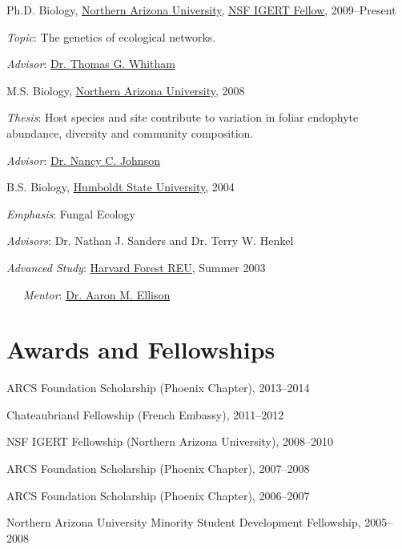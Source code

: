 \documentclass[letterpaper]{article}
\renewenvironment{itemize}{
  \begin{list}{}{
    \setlength{\leftmargin}{1em}
  }
}{
  \end{list}
}
\begin{document}
\begin{itemize}
  \item Ph.D. Biology, \href{http://www.nau.edu}{Northern Arizona
    University}, \href{http://www.mpcer.nau.edu/igert/}{NSF IGERT
    Fellow}, 2009--Present
    \begin{itemize}
    \item \textit{Topic}: The genetics of ecological networks.
    \item \textit{Advisor}:
      \href{http://www6.nau.edu/biology/People/Faculty/Whitham/Whitham.htm}{Dr. Thomas G. Whitham} 
    \end{itemize}

  \item M.S. Biology, \href{http://www.nau.edu}{Northern Arizona University}, 2008
	\begin{itemize}
    \item \textit{Thesis}: Host species and site contribute to variation in foliar endophyte abundance, diversity and community composition.
    \item \textit{Advisor}: \href{http://www.nau.edu/~envsci/johnsonlab/index.htm}{Dr. Nancy C. Johnson}
	\end{itemize}

  \item B.S. Biology, \href{http://www.humboldt.edu/~biosci/}{Humboldt State University}, 2004
    \begin{itemize}
    \item \textit{Emphasis}: Fungal Ecology
    \item \textit{Advisors}: Dr. Nathan J. Sanders and Dr. Terry W. Henkel
    \item \textit{Advanced Study}:
      \href{http://harvardforest.fas.harvard.edu/education/reu/reu.html}{Harvard
        Forest REU}, Summer 2003
    \item \ \ \  \textit{Mentor}: \href{http://harvardforest.fas.harvard.edu/profiles/ellison.html}{Dr. Aaron M. Ellison} 
    \end{itemize}

\end{itemize}

\section*{Awards and Fellowships}

\begin{itemize}
\item ARCS Foundation Scholarship (Phoenix Chapter), 2013--2014
\item Chateaubriand Fellowship (French Embassy), 2011--2012
\item NSF IGERT Fellowship (Northern Arizona University), 2008--2010
\item ARCS Foundation Scholarship (Phoenix Chapter), 2007--2008
\item ARCS Foundation Scholarship (Phoenix Chapter), 2006--2007
\item Northern Arizona University Minority Student Development Fellowship, 2005--2008
\end{itemize}
\end{document}
